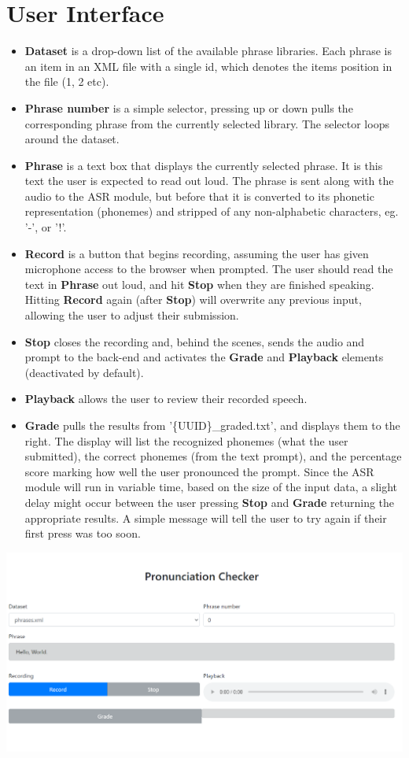 \documentclass[12pt, letterpaper]{article}
\begin{document}
\section*{User Interface}
\begin{itemize}
    \item \textbf{Dataset} is a drop-down list of the available phrase libraries. Each phrase is an item in an XML file with a single id, which denotes the items position in the file (1, 2 etc).
    \item \textbf{Phrase number} is a simple selector, pressing up or down pulls the corresponding phrase from the currently selected library. The selector loops around the dataset.
    \item \textbf{Phrase} is a text box that displays the currently selected phrase. It is this text the user is expected to read out loud. The phrase is sent along with the audio to the ASR module, but before that it is converted to its phonetic representation (phonemes) and stripped of any non-alphabetic characters, eg. '-', or '!'.
    \item \textbf{Record} is a button that begins recording, assuming the user has given microphone access to the browser when prompted. The user should read the text in \textbf{Phrase} out loud, and hit \textbf{Stop} when they are finished speaking. Hitting \textbf{Record} again (after \textbf{Stop}) will overwrite any previous input, allowing the user to adjust their submission.
    \item \textbf{Stop} closes the recording and, behind the scenes, sends the audio and prompt to the back-end and activates the \textbf{Grade} and \textbf{Playback} elements (deactivated by default).
    \item \textbf{Playback} allows the user to review their recorded speech. 
    \item \textbf{Grade} pulls the results from '\{UUID\}\_graded.txt', and displays them to the right. The display will list the recognized phonemes (what the user submitted), the correct phonemes (from the text prompt), and the percentage score marking how well the user pronounced the prompt. Since the ASR module will run in variable time, based on the size of the input data, a slight delay might occur between the user pressing \textbf{Stop} and \textbf{Grade} returning the appropriate results. A simple message will tell the user to try again if their first press was too soon. 
\end{itemize}

\begin{center}
    \includegraphics[scale=0.33]{images/homepage.png}
\end{center}
\end{document}
